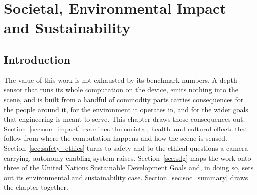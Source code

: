 \chapter{Societal, Environmental Impact and Sustainability}
\label{ch:socio}

\section{Introduction}
The value of this work is not exhausted by its benchmark numbers. A depth
sensor that runs its whole computation on the device, emits nothing into
the scene, and is built from a handful of commodity parts carries
consequences for the people around it, for the environment it operates
in, and for the wider goals that engineering is meant to serve. This
chapter draws those consequences out. Section~\ref{sec:soc_impact}
examines the societal, health, and cultural effects that follow from
where the computation happens and how the scene is sensed.
Section~\ref{sec:safety_ethics} turns to safety and to the ethical
questions a camera-carrying, autonomy-enabling system raises.
Section~\ref{sec:sdg} maps the work onto three of the United Nations
Sustainable Development Goals and, in doing so, sets out its
environmental and sustainability case. Section~\ref{sec:soc_summary}
draws the chapter together.

\FloatBarrier
